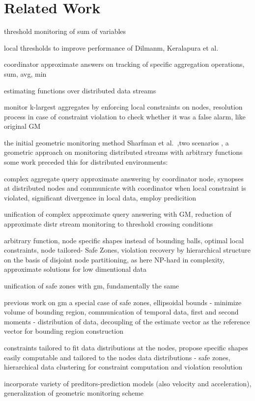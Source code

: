 \chapter{Related Work} \label{chap:relWork}

threshold monitoring of sum of variables~\cite{DilmanReactiveMonitoring}

local thresholds to improve performance of Dilmanm, Keralapura et al.~\cite{KeralapuraCommEfficientThresholdCounts}


coordinator approximate answers on tracking of specific aggregation operations, sum, avg, min\cite{OlstonAdaptiveFiltersContQueries}

estimating functions over distributed data streams~\cite{GibbonsSimpleFuncEstimationOverUnion, GibbonsDistrStreamAlgosSlidingWindows}

monitor k-largest aggregates by enforcing local constraints on nodes, 
resolution process in case of constraint violation to check whether it was a false alarm, like original GM~\cite{BabcockDistributedTopk}

the initial geometric monitoring method Sharfman et al.~\cite{Sharfman2006GM},two scenarios , a geometric approach on monitoring distributed streams with arbitrary functions
some work preceded this for distributed environments:

complex aggregate query approximate answering by coordinator node, synopses at distributed nodes and communicate with coordinator when local constraint is violated, significant divergence in local data, employ predicition~\cite{CormodeApproxContQueryingDistrStreams}

unification of complex approximate query answering with GM, reduction of approximate distr stream monitoring to threshold crossing conditions~\cite{Garofalakis2013SketchBasedGM}

arbitrary function, node specific shapes instead of bounding balls, optimal local constraints, node tailored- Safe Zones, violation recovery by hierarchical structure on the basis of disjoint node partitioning, as here
NP-hard in complexity, approximate solutions for low dimentional data~\cite{Keren2013SafeZones}

unification of safe zones with gm, fundamentally the same~\cite{Samoladas2013Unification}

previous work on gm a special case of safe zones, ellipsoidal bounds - minimize volume of bounding region, communication of temporal data, first and second moments - distribution of data, decoupling of the estimate vector as the reference vector for bounding region construction~\cite{Sharfman2012ShapeSensGM}

constraints tailored to fit data distributions at the nodes, propose specific shapes easily computable and tailored to the nodes data distributions - safe zones, hierarchical data clustering for constraint computation and violation resolution~\cite{Keren2014GMHetStreams}

incorporate variety of preditors-prediction models (also velocity and acceleration), generalization of geometric monitoring scheme~\cite{GiatrakosPredictionGM}
